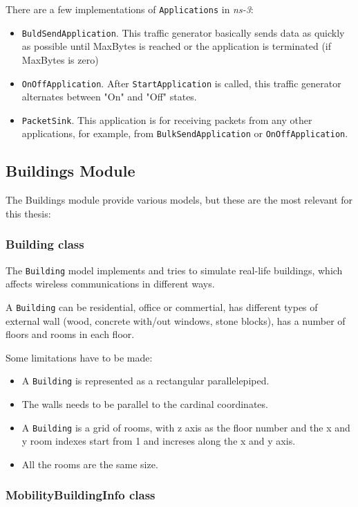 There are a few implementations of \texttt{Applications} in \textit{ns-3}:
\begin{itemize}[topsep=0pt, itemsep=0pt]
  \item \texttt{BuldSendApplication}. This traffic generator basically sends data as quickly as possible
  until MaxBytes is reached or the application is terminated (if MaxBytes is zero)
  \item \texttt{OnOffApplication}. After \texttt{StartApplication} is called, this traffic generator 
  alternates between "On" and "Off" states.
  \item \texttt{PacketSink}. This application is for receiving packets from any other applications, for
  example, from \texttt{BulkSendApplication} or \texttt{OnOffApplication}.
\end{itemize}

\subsection{Buildings Module}
The Buildings module provide various models, but these are the most relevant for this thesis:

\subsubsection{Building class}

The \texttt{Building} model implements and tries to simulate real-life buildings, which affects
wireless communications in different ways.

A \texttt{Building} can be residential, office or commertial, has different types of external
wall (wood, concrete with/out windows, stone blocks), has a number of floors and rooms in each floor.

Some limitations have to be made:
\begin{itemize}[topsep=0pt]
  \item A \texttt{Building} is represented as a rectangular parallelepiped.
  \item The walls needs to be parallel to the cardinal coordinates.
  \item A \texttt{Building} is a grid of rooms, with z axis as the floor number and the x and y room
  indexes start from 1 and increses along the x and y axis.
  \item All the rooms are the same size.
\end{itemize}

\subsubsection{MobilityBuildingInfo class}

